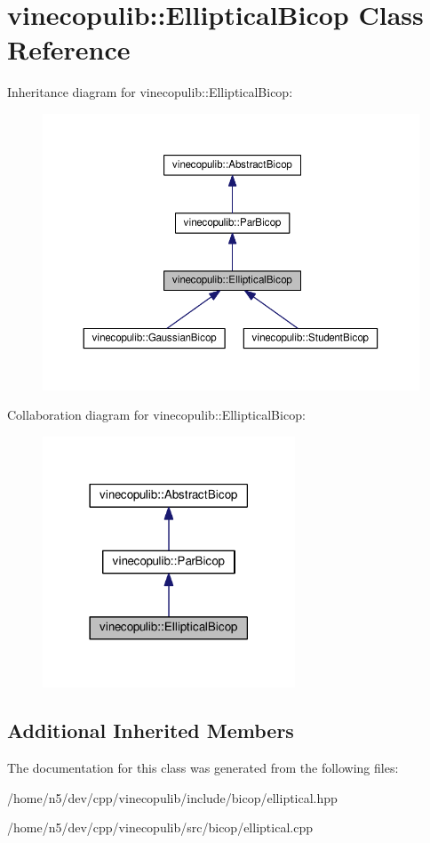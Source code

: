 \hypertarget{classvinecopulib_1_1_elliptical_bicop}{}\section{vinecopulib\+:\+:Elliptical\+Bicop Class Reference}
\label{classvinecopulib_1_1_elliptical_bicop}


Inheritance diagram for vinecopulib\+:\+:Elliptical\+Bicop\+:\nopagebreak
\begin{figure}[H]
\begin{center}
\leavevmode
\includegraphics[width=350pt]{classvinecopulib_1_1_elliptical_bicop__inherit__graph}
\end{center}
\end{figure}


Collaboration diagram for vinecopulib\+:\+:Elliptical\+Bicop\+:\nopagebreak
\begin{figure}[H]
\begin{center}
\leavevmode
\includegraphics[width=213pt]{classvinecopulib_1_1_elliptical_bicop__coll__graph}
\end{center}
\end{figure}
\subsection*{Additional Inherited Members}


The documentation for this class was generated from the following files\+:\begin{DoxyCompactItemize}
\item 
/home/n5/dev/cpp/vinecopulib/include/bicop/elliptical.\+hpp\item 
/home/n5/dev/cpp/vinecopulib/src/bicop/elliptical.\+cpp\end{DoxyCompactItemize}
